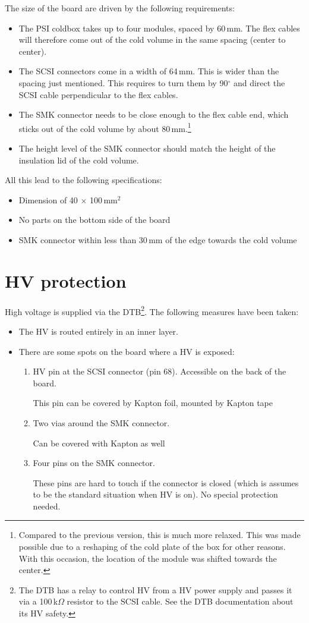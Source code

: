 The size of the board are driven by the following requirements:
\begin{itemize}
    \item The PSI coldbox takes up to four modules, spaced by 60\,mm. The flex cables will therefore come out of the cold volume in the same spacing (center to center).
    \item The SCSI connectors come in a width of 64\,mm. This is wider than the spacing just mentioned. This requires to turn them by 90$^\circ$ and direct the SCSI cable perpendicular to the flex cables.
    \item The SMK connector needs to be close enough to the flex cable end, which sticks out of the cold volume by about 80\,mm.\footnote{Compared to the previous version, this is much more relaxed. This was made possible due to a reshaping of the cold plate of the box for other reasons. With this occasion, the location of the module was shifted towards the center.}
    \item The height level of the SMK connector should match the height of the insulation lid of the cold volume.
\end{itemize}
All this lead to the following specifications:
\begin{itemize}
    \item Dimension of 40 $\times$ 100\,mm$^2$
    \item No parts on the bottom side of the board
    \item SMK connector within less than 30\,mm of the edge towards the cold volume
\end{itemize}

\section{HV protection}
High voltage is supplied via the DTB\footnote{The DTB has a relay to control HV from a HV power supply and passes it via a 100\,k$\Omega$ resistor to the SCSI cable. See the DTB documentation about its HV safety.}. The following measures have been taken:
\begin{itemize}
    \item The HV is routed entirely in an inner layer.
    \item There are some spots on the board where a HV is exposed:
    \begin{enumerate}
	\item HV pin at the SCSI connector (pin 68). Accessible on the back of the board.
    
	This pin can be covered by Kapton foil, mounted by Kapton tape
	\item Two vias around the SMK connector.
    
	Can be covered with Kapton as well
	\item Four pins on the SMK connector.
    
	These pins are hard to touch if the connector is closed (which is assumes to be the standard situation when HV is on). No special protection needed.
    \end{enumerate}
\end{itemize}

